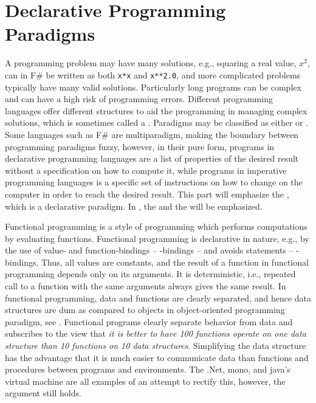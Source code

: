 \documentclass[fsharpNotes.tex]{subfiles}
\begin{document}
\part{Declarative Programming Paradigms}
\label{part:declarative}
A programming problem may have many solutions, e.g., squaring a real value, $x^2$, can in F\# be written as both \lstinline{x*x} and \lstinline{x**2.0}, and more complicated problems typically have many valid solutions. Particularly long programs can be complex and can have a high risk of programming errors. Different programming languages offer different structures to aid the programming in managing complex solutions, which is sometimes called a . Paradigms may be classified as either  or . Some languages such as F\# are multiparadigm, making the boundary between programming paradigms fuzzy, however, in their pure form, programs in declarative programming languages are a list of properties of the desired result without a specification on how to compute it, while programs in imperative programming languages is a specific set of instructions on how to change  on the computer in order to reach the desired result. This part will emphasize the , which is a declarative paradigm. In , the  and the  will be emphasized.

Functional programming is a style of programming which performs computations by evaluating functions. Functional programming is declarative in nature, e.g., by the use of value- and function-bindings -- -bindings -- and avoids statements -- -bindings. Thus, all values are constants, and the result of a function in functional programming depends only on its arguments. It is deterministic, i.e., repeated call to a function with the same arguments always gives the same result. In functional programming, data and functions are clearly separated, and hence data structures are dum as compared to objects in object-oriented programming paradigm, see . Functional programs clearly separate behavior from data and subscribes to the view that \emph{it is better to have 100 functions operate on one data structure than 10 functions on 10 data structures}. Simplifying the data structure has the advantage that it is much easier to communicate data than functions and procedures between programs and environments. The .Net, mono, and java's virtual machine are all examples of an attempt to rectify this, however, the argument still holds.
\end{document}
